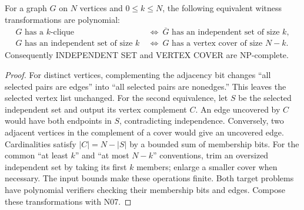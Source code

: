 \begin{theorem}\label{thm:N08}
For a graph $G$ on $N$ vertices and $0\le k\le N$, the following equivalent
witness transformations are polynomial:
\[
\begin{split}
G\text{ has a }k\text{-clique}
 &\ \Longleftrightarrow\ \overline G\text{ has an independent set of size }k,\\
G\text{ has an independent set of size }k
 &\ \Longleftrightarrow\ G\text{ has a vertex cover of size }N-k.
\end{split}
\]
Consequently INDEPENDENT SET and VERTEX COVER are NP-complete.
\end{theorem}
\begin{proof}
For distinct vertices, complementing the adjacency bit changes ``all selected
pairs are edges'' into ``all selected pairs are nonedges.'' This leaves the
selected vertex list unchanged. For the second equivalence, let $S$ be the
selected independent set and output its vertex complement $C$. An edge
uncovered by $C$ would have both endpoints in $S$, contradicting independence.
Conversely, two adjacent vertices in the complement of a cover would give an
uncovered edge. Cardinalities satisfy $|C|=N-|S|$ by a bounded sum of membership
bits. For the common ``at least $k$'' and ``at most $N-k$'' conventions, trim
an oversized independent set by taking its first $k$ members; enlarge a
smaller cover when necessary. The input bounds make these operations finite.
Both target problems have polynomial verifiers checking their membership
bits and edges. Compose these transformations with N07.
\end{proof}


